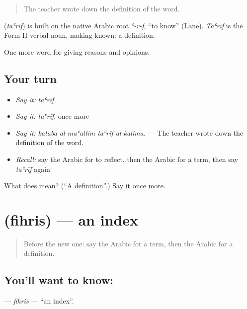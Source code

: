 \begin{quote}
The teacher wrote down the definition of the word.
\end{quote}

\begin{cousinweb}
\textbf{} (\emph{taʿrīf}) is built on the native Arabic root \emph{ʿ-r-f}, \textquotedblleft{}to know\textquotedblright{} (Lane). \emph{Taʿrīf} is the Form II verbal noun, making known: a definition.
\end{cousinweb}

\begin{grammarlens}[title={What you've built}]
One more word for giving reasons and opinions.
\end{grammarlens}

\subsection*{Your turn}
\begin{itemize}
\raggedright
  \item \emph{Say it:} \emph{taʿrīf}
  \item \emph{Say it:} \emph{taʿrīf}, once more
  \item \emph{Say it:} \emph{kataba al-muʿallim taʿrīf al-kalima.} — The teacher wrote down the definition of the word.
  \item \emph{Recall:} say the Arabic for to reflect, then the Arabic for a term, then say \emph{taʿrīf} again
\end{itemize}

\begin{tcolorbox}[breakable,colback=teal!4,colframe=teal!35!black,title={Before you move on}]
What does  mean? (\textquotedblleft{}A definition\textquotedblright{}.) Say it once more.
\end{tcolorbox}
\section[\texorpdfstring{\ar{فهرس} (fihris)}{فهرس (fihris)}]{ (fihris) — an index}

\label{lesson:AR-C396-fihris}



\begin{quote}
Before the new one: say the Arabic for a term, then the Arabic for a definition.
\end{quote}

\subsection*{You'll want to know: }
\textbf{} — \emph{fihris} — \textquotedblleft{}an index\textquotedblright{}.

